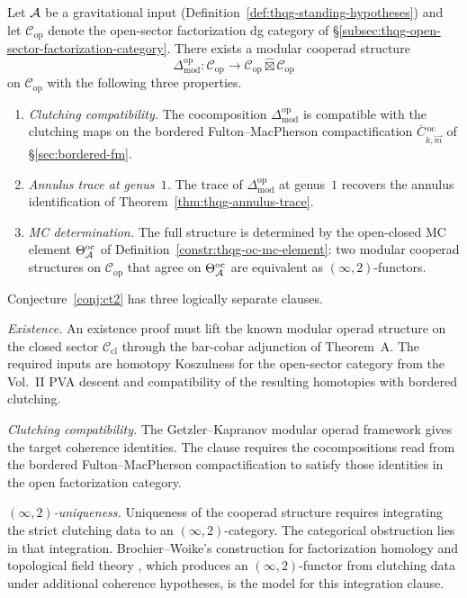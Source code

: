 \begin{conjecture}
\ClaimStatusConjectured
\label{conj:ct2}
Let $\mathcal{A}$ be a gravitational input
(Definition~\ref{def:thqg-standing-hypotheses}) and let
$\mathcal{C}_{\mathrm{op}}$ denote the open-sector factorization
dg category of
\S\ref{subsec:thqg-open-sector-factorization-category}.
There exists a modular cooperad structure
\[
\Delta^{\mathrm{op}}_{\mathrm{mod}}
\colon
\mathcal{C}_{\mathrm{op}}
\longrightarrow
\mathcal{C}_{\mathrm{op}} \mathbin{\widehat{\boxtimes}}
\mathcal{C}_{\mathrm{op}}
\]
on $\mathcal{C}_{\mathrm{op}}$ with the following three properties.
\begin{enumerate}[label=\textup{(\alph*)}]
\item \emph{Clutching compatibility.}
 The cocomposition $\Delta^{\mathrm{op}}_{\mathrm{mod}}$ is compatible
 with the clutching maps on the bordered Fulton--MacPherson
 compactification $\overline{C}{}^{\,\mathrm{oc}}_{k,\vec{m}}$
 of \S\ref{sec:bordered-fm}.
\item \emph{Annulus trace at genus~$1$.}
 The trace of $\Delta^{\mathrm{op}}_{\mathrm{mod}}$ at genus~$1$
 recovers the annulus identification of
 Theorem~\ref{thm:thqg-annulus-trace}.
\item \emph{MC determination.}
 The full structure is determined by the open-closed MC element
 $\Theta^{\mathrm{oc}}_{\mathcal{A}}$ of
 Definition~\ref{constr:thqg-oc-mc-element}: two modular cooperad
 structures on $\mathcal{C}_{\mathrm{op}}$ that agree on
 $\Theta^{\mathrm{oc}}_{\mathcal{A}}$ are equivalent as
 $(\infty,2)$-functors.
\end{enumerate}
\end{conjecture}

\begin{remark}
\label{rem:ct2-existence-coherence-obligations}
Conjecture~\ref{conj:ct2} has three logically separate clauses.

\emph{Existence.}
An existence proof must lift the known modular operad structure on
the closed sector $\mathcal{C}_{\mathrm{cl}}$ through the bar-cobar
adjunction of Theorem~A. The required inputs are homotopy Koszulness
for the open-sector category from the Vol.~II PVA descent and
compatibility of the resulting homotopies with bordered clutching.

\emph{Clutching compatibility.}
The Getzler--Kapranov modular operad framework
\cite{GetzlerKapranov98} gives the target coherence identities.
The clause requires the cocompositions read from the bordered
Fulton--MacPherson compactification to satisfy those identities in
the open factorization category.

\emph{$(\infty,2)$-uniqueness.}
Uniqueness of the cooperad structure requires integrating the
strict clutching data to an $(\infty,2)$-category. The categorical
obstruction lies in that integration. Brochier--Woike's construction for
factorization homology and topological field theory
\cite{BrochierWoike2022}, which produces an $(\infty,2)$-functor
from clutching data under additional coherence hypotheses, is the
model for this integration clause.
\end{remark}

